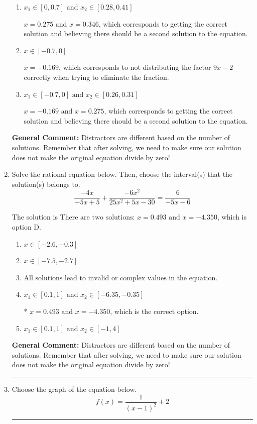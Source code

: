 \documentclass{extbook}[14pt]
\newcommand{\litem}[1]{\item #1

\rule{\textwidth}{0.4pt}}
\begin{document}
\begin{enumerate}
{\begin{enumerate}[label=\Alph*.]
* $x = 0.275$, which is the correct option.
\item \( x_1 \in [0, 0.7] \text{ and } x_2 \in [0.28,0.41] \)

$x = 0.275 \text{ and } x = 0.346$, which corresponds to getting the correct solution and believing there should be a second solution to the equation.
\item \( x \in [-0.7,0] \)

$x = -0.169$, which corresponds to not distributing the factor $9x -2$ correctly when trying to eliminate the fraction.
\item \( x_1 \in [-0.7, 0] \text{ and } x_2 \in [0.26,0.31] \)

$x = -0.169 \text{ and } x = 0.275$, which corresponds to getting the correct solution and believing there should be a second solution to the equation.
\end{enumerate}

\textbf{General Comment:} Distractors are different based on the number of solutions. Remember that after solving, we need to make sure our solution does not make the original equation divide by zero!
}
\litem{
Solve the rational equation below. Then, choose the interval(s) that the solution(s) belongs to.
\[ \frac{-4x}{-5x + 5} + \frac{-6x^{2}}{25x^{2} +5 x -30} = \frac{6}{-5x -6} \]

The solution is \( \text{There are two solutions: } x = 0.493 \text{ and } x = -4.350 \), which is option D.\begin{enumerate}[label=\Alph*.]
\item \( x \in [-2.6,-0.3] \)


\item \( x \in [-7.5,-2.7] \)


\item \( \text{All solutions lead to invalid or complex values in the equation.} \)


\item \( x_1 \in [0.1, 1] \text{ and } x_2 \in [-6.35,-0.35] \)

* $x = 0.493 \text{ and } x = -4.350$, which is the correct option.
\item \( x_1 \in [0.1, 1] \text{ and } x_2 \in [-1,4] \)


\end{enumerate}

\textbf{General Comment:} Distractors are different based on the number of solutions. Remember that after solving, we need to make sure our solution does not make the original equation divide by zero!
}
\litem{
Choose the graph of the equation below.
\[ f(x) = \frac{1}{(x - 1)^2} + 2 \]

}
\end{enumerate}
\end{document}
